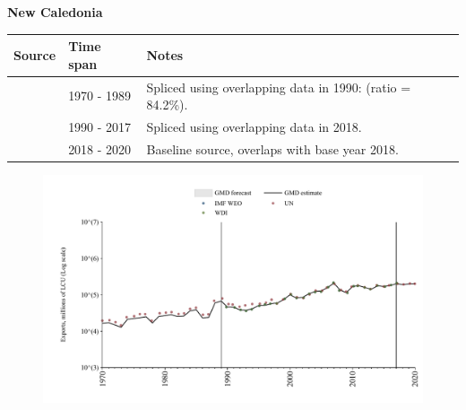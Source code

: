 \documentclass[12pt,a4paper,landscape]{article}
\begin{document}
\begin{adjustbox}{max totalsize={\paperwidth}{\paperheight},center}
\begin{minipage}[t][\textheight][t]{\textwidth}
\vspace*{0.5cm}
{}
\begin{center}
{\Large\bfseries New Caledonia}
\end{center}
\vspace{0.5cm}
\begin{table}[H]
\centering
\small
\begin{tabular}{|l|l|l|}
\hline
\textbf{Source} & \textbf{Time span} & \textbf{Notes} \\
\hline
\rowcolor{white}\cite{UN}& 1970 - 1989 &Spliced using overlapping data in 1990: (ratio = 84.2\%).\\
\rowcolor{lightgray}\cite{WDI}& 1990 - 2017 &Spliced using overlapping data in 2018.\\
\rowcolor{white}\cite{UN}& 2018 - 2020 &Baseline source, overlaps with base year 2018.\\
\hline
\end{tabular}
\end{table}
\begin{figure}[H]
\centering
\includegraphics[width=\textwidth,height=0.6\textheight,keepaspectratio]{graphs/NCL_exports.pdf}
\end{figure}
\end{minipage}
\end{adjustbox}
\end{document}
